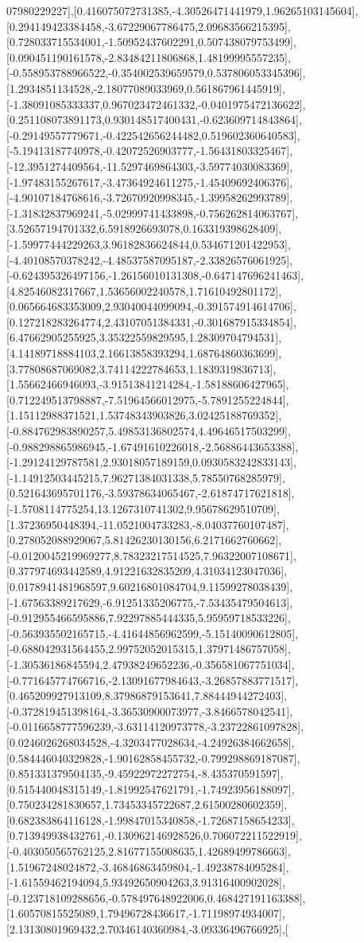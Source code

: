 \documentclass{article}
\begin{document}
07980229227],[0.416075072731385,-4.30526471441979,1.96265103145604],[0.294149423384458,-3.67229067786475,2.09683566215395],[0.728033715534001,-1.50952437602291,0.507438079753499],[0.090451190161578,-2.83484211806868,1.48199995557235],[-0.558953788966522,-0.354002539659579,0.537806053345396],[1.2934851134528,-2.18077089033969,0.561867961445919],[-1.38091085333337,0.967023472461332,-0.0401975472136622],[0.251108073891173,0.930148517400431,-0.623609714843864],[-0.29149557779671,-0.422542656244482,0.519602360640583],[-5.19413187740978,-0.42072526903777,-1.56431803325467],[-12.3951274409564,-11.5297469864303,-3.59774030083369],[-1.97483155267617,-3.47364924611275,-1.45409692406376],[-4.90107184768616,-3.72670920998345,-1.39958262993789],[-1.31832837969241,-5.02999741433898,-0.756262814063767],[3.52657194701332,6.5918926693078,0.163319398628409],[-1.59977444229263,3.96182836624844,0.534671201422953],[-4.40108570378242,-4.48537587095187,-2.33826576061925],[-0.624395326497156,-1.26156010131308,-0.647147696241463],[4.82546082317667,1.53656002240578,1.71610492801172],[0.065664683353009,2.93040044099094,-0.391574914614706],[0.127218283264774,2.43107051384331,-0.301687915334854],[6.47662905255925,3.35322559829595,1.28309704794531],[4.14189718884103,2.16613858393294,1.68764860363699],[3.77808687069082,3.74114222784653,1.1839319836713],[1.55662466946093,-3.91513841214284,-1.58188606427965],[0.712249513798887,-7.51964566012975,-5.7891255224844],[1.15112988371521,1.53748343903826,3.02425188769352],[-0.884762983890257,5.49853136802574,4.49646517503299],[-0.988298865986945,-1.67491610226018,-2.56886443653388],[-1.29124129787581,2.93018057189159,0.0930583242833143],[-1.14912503445215,7.96271384031338,5.78550768285979],[0.521643695701176,-3.59378634065467,-2.61874717621818],[-1.5708114775254,13.1267310741302,9.95678629510709],[1.37236950448394,-11.0521004733283,-8.04037760107487],[0.278052088929067,5.81426230130156,6.2171662760662],[-0.0120045219969277,8.78323217514525,7.96322007108671],[0.377974693442589,4.91221632835209,4.31034123047036],[0.0178941481968597,9.60216801084704,9.11599278038439],[-1.67563389217629,-6.91251335206775,-7.53435479504613],[-0.912955466595886,7.92297885444335,5.95959718533226],[-0.563935502165715,-4.41644856962599,-5.15140090612805],[-0.688042931564455,2.99752052015315,1.37971486757058],[-1.30536186845594,2.47938249652236,-0.356581067751034],[-0.771645774766716,-2.13091677984643,-3.26857883771517],[0.465209927913109,8.37986879153641,7.88444944272403],[-0.372819451398164,-3.36530900073977,-3.8466578042541],[-0.0116658777596239,-3.63114120973778,-3.23722861097828],[0.0246026268034528,-4.3203477028634,-4.24926384662658],[0.584446040329828,-1.90162858455732,-0.799298869187087],[0.851331379504135,-9.45922972272754,-8.435370591597],[0.515440048315149,-1.81992547621791,-1.74923956188097],[0.750234281830657,1.73453345722687,2.61500280602359],[0.682383864116128,-1.99847015340858,-1.72687158654233],[0.713949938432761,-0.130962146928526,0.706072211522919],[-0.403050565762125,2.81677155008635,1.42689499786663],[1.51967248024872,-3.46846863459804,-1.49238784095284],[-1.61559462194094,5.93492650904263,3.91316400902028],[-0.123718109288656,-0.578497648922006,0.468427191163388],[1.60570815525089,1.79496728436617,-1.71198974934007],[2.13130801969432,2.70346140360984,-3.09336496766925],[
\end{document}
